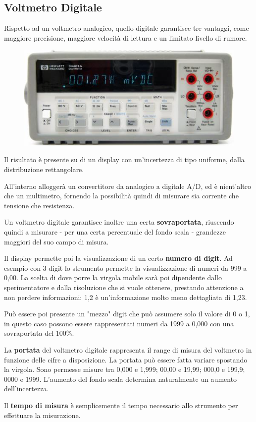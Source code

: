 \documentclass[a4paper, 15pt]{article}
\begin{document}
\subsection{Voltmetro Digitale}	
\begin{adjustwidth}{2in}{}	
		Rispetto ad un voltmetro analogico, quello digitale garantisce tre vantaggi, come maggiore precisione, maggiore velocità di lettura e un limitato livello di rumore. 		 
		\begin{figure}[H]
			\centering
			\includegraphics[width=0.5\linewidth]{fig/screenshot010}
			\label{fig:screenshot010}
		\end{figure}		
		Il risultato è presente su di un display con un'incertezza di tipo uniforme, dalla distribuzione rettangolare. 
		
		All'interno alloggerà un convertitore da analogico a digitale A/D, ed è nient'altro che un multimetro, fornendo la possibilità quindi di misurare sia corrente che tensione che resistenza. \newline 
		
		Un voltmetro digitale garantisce inoltre una certa \textbf{sovraportata}, riuscendo quindi a misurare - per una certa percentuale del fondo scala - grandezze maggiori del suo campo di misura. 
		
		Il display permette poi la visualizzazione di un certo \textbf{numero di digit}. Ad esempio con 3 digit lo strumento permette la visualizzazione di numeri da 999 a 0,00. La scelta di dove porre la virgola mobile sarà poi dipendente dallo sperimentatore e dalla risoluzione che si vuole ottenere, prestando attenzione a non perdere informazioni: 1,2 è un'informazione molto meno dettagliata di 1,23.
		
		Può essere poi presente un "mezzo" digit che può assumere solo il valore di 0 o 1, in questo caso possono essere rappresentati numeri da 1999 a 0,000 con una sovraportata del 100\%. 
		
		La \textbf{portata} del voltmetro digitale rappresenta il range di misura del voltmetro in funzione delle cifre a
		disposizione. La portata può essere fatta variare spostando la virgola. Sono
		permesse misure tra 0,000 e 1,999; 00,00 e 19,99; 000,0 e 199,9; 0000 e 1999.
		L’aumento del fondo scala determina naturalmente un aumento dell’incertezza.
		
		Il \textbf{tempo di misura} è semplicemente il tempo necessario allo strumento per effettuare la misurazione.  
\end{adjustwidth}
\newpage
\end{document}
